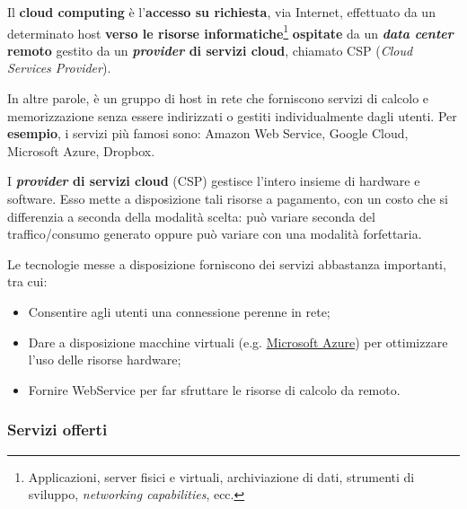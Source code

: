 \documentclass[a4paper]{article}
\begin{document}
	Il \textcolor{Red3}{\textbf{cloud computing}} è l'\textbf{accesso su richiesta}, via Internet, effettuato da un determinato host \textbf{verso le risorse informatiche}\footnote{Applicazioni, server fisici e virtuali, archiviazione di dati, strumenti di sviluppo, \emph{networking capabilities}, ecc.} \textbf{ospitate} da un \textbf{\emph{data center} remoto} gestito da un \textbf{\emph{provider} di servizi cloud}, chiamato CSP (\emph{Cloud Services Provider}).\newline
	
	\noindent
	In altre parole, è un gruppo di host in rete che forniscono servizi di calcolo e memorizzazione senza essere indirizzati o gestiti individualmente dagli utenti. Per \textcolor{Green4}{\textbf{esempio}}, i servizi più famosi sono: Amazon Web Service, Google Cloud, Microsoft Azure, Dropbox.\newline
	
	\noindent
	I \textbf{\emph{provider} di servizi cloud} (CSP) gestisce l'intero insieme di hardware e software. Esso mette a disposizione tali risorse a pagamento, con un costo che si differenzia a seconda della modalità scelta: può variare seconda del traffico/consumo generato oppure può variare con una modalità forfettaria.\newline
	
	\noindent
	Le tecnologie messe a disposizione forniscono dei servizi abbastanza importanti, tra cui:
	\begin{itemize}
		\item Consentire agli utenti una connessione perenne in rete;
		
		\item Dare a disposizione macchine virtuali (e.g. \href{https://azure.microsoft.com/it-it/resources/cloud-computing-dictionary/what-is-azure/}{Microsoft Azure}) per ottimizzare l'uso delle risorse hardware;
		
		\item Fornire WebService per far sfruttare le risorse di calcolo da remoto.
	\end{itemize}\newpage
	
	\subsubsection{Servizi offerti}
	
\end{document}
